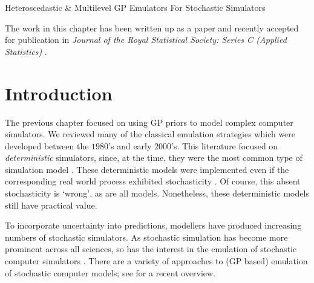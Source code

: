 \begin{chapter}{Heteroscedastic \& Multilevel GP Emulators For Stochastic Simulators\label{Ch:Hetsml}}

The work in this chapter has been written up as a paper and recently accepted for publication in \emph{Journal of the Royal Statistical Society: Series C (Applied Statistics)} \citep{Kennedy2023}. 
\section{Introduction}
The previous chapter focused on using GP priors to model complex computer simulators. We reviewed many of the classical emulation strategies which were developed between the $1980$'s and early $2000$'s. This literature focused on \textit{deterministic} simulators, since, at the time, they were the most common type of simulation model \citep{Sacks89,Craig1997, Ohagan01, Santner2003}. These deterministic models were implemented even if the corresponding real world process exhibited stochasticity \citep{Ohagan01}. Of course, this absent stochasticity is `wrong', as are all models. Nonetheless, these deterministic models still have practical value.

To incorporate uncertainty into predictions, modellers have produced increasing numbers of stochastic simulators. As stochastic simulation has become more prominent across all sciences, so has the interest in the emulation of stochastic computer simulators \citep{Henderson09, Astfalck19, Rocchetta2018, Boys2018}. There are a variety of approaches to (GP based) emulation of stochastic computer models; see \citet{Baker2022} for a recent overview.


\end{chapter}
